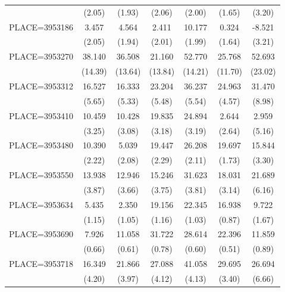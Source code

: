 {\begin{tabular}{l*{6}{c}}
                    &      (2.05)&      (1.93)&      (2.06)&      (2.00)&      (1.65)&      (3.20)\\
PLACE=3953186       &       3.457&       4.564&       2.411&      10.177&       0.324&      -8.521\\
                    &      (2.05)&      (1.94)&      (2.01)&      (1.99)&      (1.64)&      (3.21)\\
PLACE=3953270       &      38.140&      36.508&      21.160&      52.770&      25.768&      52.693\\
                    &     (14.39)&     (13.64)&     (13.84)&     (14.21)&     (11.70)&     (23.02)\\
PLACE=3953312       &      16.527&      16.333&      23.204&      36.237&      24.963&      31.470\\
                    &      (5.65)&      (5.33)&      (5.48)&      (5.54)&      (4.57)&      (8.98)\\
PLACE=3953410       &      10.459&      10.428&      19.835&      24.894&       2.644&       2.959\\
                    &      (3.25)&      (3.08)&      (3.18)&      (3.19)&      (2.64)&      (5.16)\\
PLACE=3953480       &      10.390&       5.039&      19.447&      26.208&      19.697&      15.844\\
                    &      (2.22)&      (2.08)&      (2.29)&      (2.11)&      (1.73)&      (3.30)\\
PLACE=3953550       &      13.938&      12.946&      15.246&      31.623&      18.031&      21.689\\
                    &      (3.87)&      (3.66)&      (3.75)&      (3.81)&      (3.14)&      (6.16)\\
PLACE=3953634       &       5.435&       2.350&      19.156&      22.345&      16.938&       9.722\\
                    &      (1.15)&      (1.05)&      (1.16)&      (1.03)&      (0.87)&      (1.67)\\
PLACE=3953690       &       7.926&      11.058&      31.722&      28.614&      22.396&      11.859\\
                    &      (0.66)&      (0.61)&      (0.78)&      (0.60)&      (0.51)&      (0.89)\\
PLACE=3953718       &      16.349&      21.866&      27.088&      41.058&      29.695&      26.694\\
                    &      (4.20)&      (3.97)&      (4.12)&      (4.13)&      (3.40)&      (6.66)\\

\end{tabular}}
